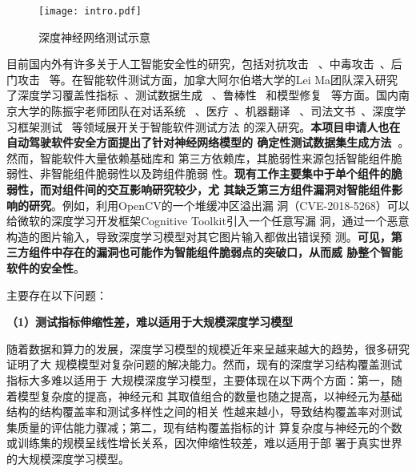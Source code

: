 \begin{figure}[htp]
    \centering
    \texttt{[image: intro.pdf]}
    \caption{深度神经网络测试示意}
    \label{fig:ch1:intro}
\end{figure}



目前国内外有许多关于人工智能安全性的研究，包括对抗攻击
~\cite{szegedy2013intriguing}、中毒攻击~\cite{zhao2020shielding}、后门攻击
~\cite{ge2021anti}等。在智能软件测试方面，加拿大阿尔伯塔大学的Lei Ma团队深入研究
了深度学习覆盖性指标~\cite{ma2018deepgauge,ma2019deepct}、测试数据生成
~\cite{xie2019coverage,xie2019deephunter}、鲁棒性
~\cite{wang2020deepsonar,sun2020stealthy,zhang2020generating}和模型修复
~\cite{yu2021deeprepair}等方面。国内南京大学的陈振宇老师团队在对话系统
~\cite{liu2021dialtest}、医疗~\cite{hou2021taumed}、机器翻译
~\cite{ji2021automated}、司法文书~\cite{guo2020taujud}、深度学习框架测试
~\cite{zhang2021duo,zhang2021predoo,luo2021graph}等领域展开关于智能软件测试方法
的深入研究。\textbf{本项目申请人也在自动驾驶软件安全方面提出了针对神经网络模型的
确定性测试数据集生成方法~\cite{xu2021deepsuite}}。然而，智能软件大量依赖基础库和
第三方依赖库，其脆弱性来源包括智能组件脆弱性、非智能组件脆弱性以及跨组件脆弱
性。\textbf{现有工作主要集中于单个组件的脆弱性，而对组件间的交互影响研究较少，尤
其缺乏第三方组件漏洞对智能组件影响的研究}。例如，利用OpenCV的一个堆缓冲区溢出漏
洞（CVE-2018-5268）可以给微软的深度学习开发框架Cognitive Toolkit引入一个任意写漏
洞，通过一个恶意构造的图片输入，导致深度学习模型对其它图片输入都做出错误预
测。\textbf{可见，第三方组件中存在的漏洞也可能作为智能组件脆弱点的突破口，从而威
胁整个智能软件的安全性}。



主要存在以下问题：

\textbf{（1）测试指标伸缩性差，难以适用于大规模深度学习模型}

随着数据和算力的发展，深度学习模型的规模近年来呈越来越大的趋势，很多研究证明了大
规模模型对复杂问题的解决能力。然而，现有的深度学习结构覆盖测试指标大多难以适用于
大规模深度学习模型，主要体现在以下两个方面：第一，随着模型复杂度的提高，神经元和
其取值组合的数量也随之提高，以神经元为基础结构的结构覆盖率和测试多样性之间的相关
性越来越小，导致结构覆盖率对测试集质量的评估能力骤减；第二，现有结构覆盖指标的计
算复杂度与神经元的个数或训练集的规模呈线性增长关系，因次伸缩性较差，难以适用于部
署于真实世界的大规模深度学习模型。


